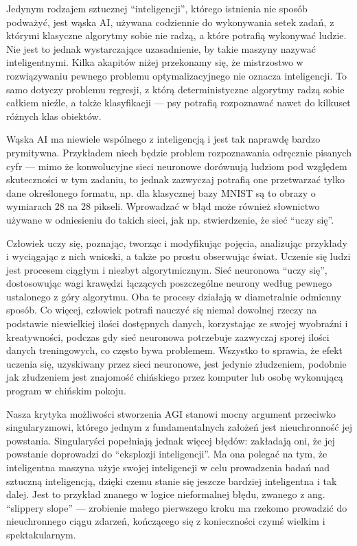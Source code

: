 \documentclass[10pt,a4paper]{article}
\begin{document}
	\par Jedynym rodzajem sztucznej ``inteligencji'', którego istnienia nie sposób podważyć, jest wąska AI, używana codziennie do wykonywania setek zadań, z którymi klasyczne algorytmy sobie nie radzą, a które potrafią wykonywać ludzie. Nie jest to jednak wystarczające uzasadnienie, by takie maszyny nazywać inteligentnymi. Kilka akapitów niżej przekonamy się, że mistrzostwo w rozwiązywaniu pewnego problemu optymalizacyjnego nie oznacza inteligencji. To samo dotyczy problemu regresji, z którą deterministyczne algorytmy radzą sobie całkiem nieźle, a także klasyfikacji — psy potrafią rozpoznawać nawet do kilkuset różnych klas obiektów.
	\par Wąska AI ma niewiele wspólnego z inteligencją i jest tak naprawdę bardzo prymitywna. Przykładem niech będzie problem rozpoznawania odręcznie pisanych cyfr — mimo że konwolucyjne sieci neuronowe dorównują ludziom pod względem skuteczności w tym zadaniu, to jednak zazwyczaj potrafią one przetwarzać tylko dane określonego formatu, np. dla klasycznej bazy MNIST są to obrazy o wymiarach 28 na 28 pikseli. Wprowadzać w błąd może również słownictwo używane w odniesieniu do takich sieci, jak np. stwierdzenie, że sieć ``uczy się''.
	\par Człowiek uczy się, poznając, tworząc i modyfikując pojęcia, analizując przykłady i wyciągając z nich wnioski, a także po prostu obserwując świat. Uczenie się ludzi jest procesem ciągłym i niezbyt algorytmicznym. Sieć neuronowa ``uczy się'', dostosowując wagi krawędzi łączących poszczególne neurony według pewnego ustalonego z góry algorytmu. Oba te procesy działają w diametralnie odmienny sposób. Co więcej, człowiek potrafi nauczyć się niemal dowolnej rzeczy na podstawie niewielkiej ilości dostępnych danych, korzystając ze swojej wyobraźni i kreatywności, podczas gdy sieć neuronowa potrzebuje zazwyczaj sporej ilości danych treningowych, co często bywa problemem. Wszystko to sprawia, że efekt uczenia się, uzyskiwany przez sieci neuronowe, jest jedynie złudzeniem, podobnie jak złudzeniem jest znajomość chińskiego przez komputer lub osobę wykonującą program w chińskim pokoju.
	\par Nasza krytyka możliwości stworzenia AGI stanowi mocny argument przeciwko singularyzmowi, którego jednym z fundamentalnych założeń jest nieuchronność jej powstania. Singularyści popełniają jednak więcej błędów: zakładają oni, że jej powstanie doprowadzi do ``eksplozji inteligencji''. Ma ona polegać na tym, że inteligentna maszyna użyje swojej inteligencji w celu prowadzenia badań nad sztuczną inteligencją, dzięki czemu stanie się jeszcze bardziej inteligentna i tak dalej. Jest to przykład znanego w logice nieformalnej błędu, zwanego z ang. ``slippery slope'' — zrobienie małego pierwszego kroku ma rzekomo prowadzić do nieuchronnego ciągu zdarzeń, kończącego się z konieczności czymś wielkim i spektakularnym.
\end{document}
